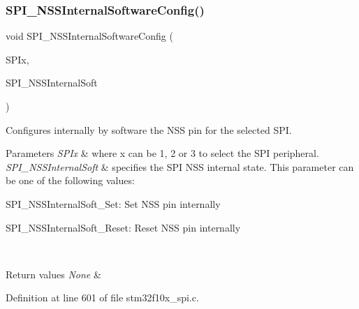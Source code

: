 \subsubsection{\texorpdfstring{S\+P\+I\+\_\+\+N\+S\+S\+Internal\+Software\+Config()}{SPI\_NSSInternalSoftwareConfig()}}
{\footnotesize\ttfamily void S\+P\+I\+\_\+\+N\+S\+S\+Internal\+Software\+Config (\begin{DoxyParamCaption}\item[{\hyperlink{struct_s_p_i___type_def}{S\+P\+I\+\_\+\+Type\+Def} $\ast$}]{S\+P\+Ix,  }\item[{uint16\+\_\+t}]{S\+P\+I\+\_\+\+N\+S\+S\+Internal\+Soft }\end{DoxyParamCaption})}



Configures internally by software the N\+SS pin for the selected S\+PI. 


\begin{DoxyParams}{Parameters}
{\em S\+P\+Ix} & where x can be 1, 2 or 3 to select the S\+PI peripheral. \\
\hline
{\em S\+P\+I\+\_\+\+N\+S\+S\+Internal\+Soft} & specifies the S\+PI N\+SS internal state. This parameter can be one of the following values\+: \begin{DoxyItemize}
\item S\+P\+I\+\_\+\+N\+S\+S\+Internal\+Soft\+\_\+\+Set\+: Set N\+SS pin internally \item S\+P\+I\+\_\+\+N\+S\+S\+Internal\+Soft\+\_\+\+Reset\+: Reset N\+SS pin internally \end{DoxyItemize}
\\
\hline
\end{DoxyParams}

\begin{DoxyRetVals}{Return values}
{\em None} & \\
\hline
\end{DoxyRetVals}


Definition at line 601 of file stm32f10x\+\_\+spi.\+c.

\mbox{\label{group___s_p_i___exported___functions_ga4ec54abdedf6cd17403d853a926d91c1}} 

